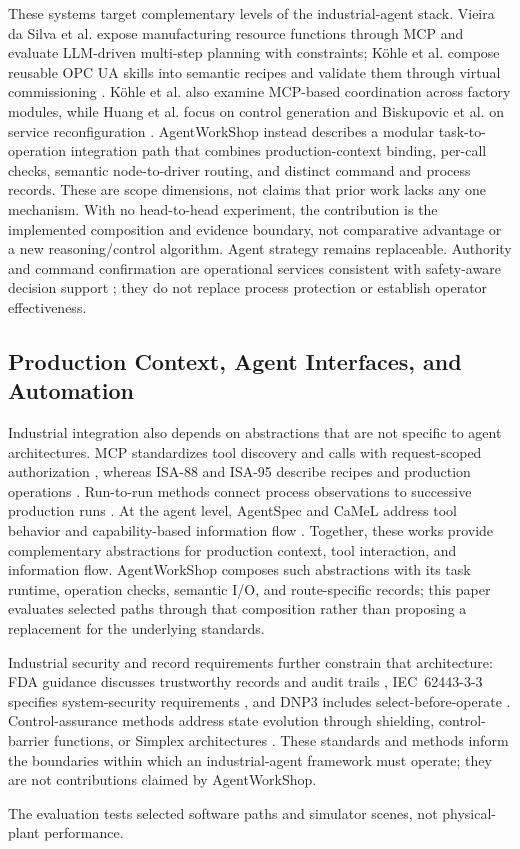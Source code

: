 These systems target complementary levels of the industrial-agent stack.
Vieira da Silva et al. expose manufacturing resource functions through MCP
and evaluate LLM-driven multi-step planning with constraints; K{\"o}hle et al.
compose reusable OPC UA skills into semantic recipes and validate them through
virtual commissioning \cite{silva2025mcpmanufacturing,koehle2025semanticrecipes}.
K{\"o}hle et al. also examine MCP-based coordination across factory modules,
while Huang et al. focus on control generation and Biskupovic et al. on
service reconfiguration \cite{koehle2026llmdriven,huang2026made,biskupovic2025supervision}.
AgentWorkShop instead describes a modular task-to-operation integration path
that combines production-context binding, per-call checks, semantic
node-to-driver routing, and distinct command and process records. These are
scope dimensions, not claims that prior work lacks any one mechanism. With no
head-to-head experiment, the contribution is the implemented composition and
evidence boundary, not comparative advantage or a new reasoning/control
algorithm. Agent strategy remains replaceable.
Authority and command confirmation are operational services consistent with
safety-aware decision support \cite{jiang2026agentic}; they do not replace
process protection or establish operator effectiveness.

\subsection{Production Context, Agent Interfaces, and Automation}
Industrial integration also depends on abstractions that are not specific to
agent architectures. MCP standardizes tool discovery and calls with
request-scoped authorization \cite{mcp2024}, whereas
ISA-88 and ISA-95 describe recipes and production operations
\cite{isa88_2010,isa95_2025}. Run-to-run methods connect process observations
to successive production runs \cite{moyne2000r2r}. At the agent level,
AgentSpec and CaMeL address tool behavior and capability-based information
flow \cite{wang2025agentspec,debenedetti2025camel}. Together, these works
provide complementary abstractions for production context, tool interaction,
and information flow. AgentWorkShop composes such abstractions with its task
runtime, operation checks, semantic I/O, and route-specific records; this
paper evaluates selected paths through that composition rather than proposing
a replacement for the underlying standards.

Industrial security and record requirements further constrain that
architecture: FDA guidance discusses trustworthy records and audit trails
\cite{part11}, IEC~62443-3-3 specifies system-security requirements
\cite{iec62443-3-3}, and DNP3 includes select-before-operate
\cite{ieee1815dnp3}. Control-assurance methods address state evolution through
shielding, control-barrier functions, or Simplex architectures
\cite{alshiekh2018shielding,ames2017cbf,sha2001simplex}. These standards and
methods inform the boundaries within which an industrial-agent framework must
operate; they are not contributions claimed by AgentWorkShop.

The evaluation tests selected software paths and simulator scenes, not
physical-plant performance.
